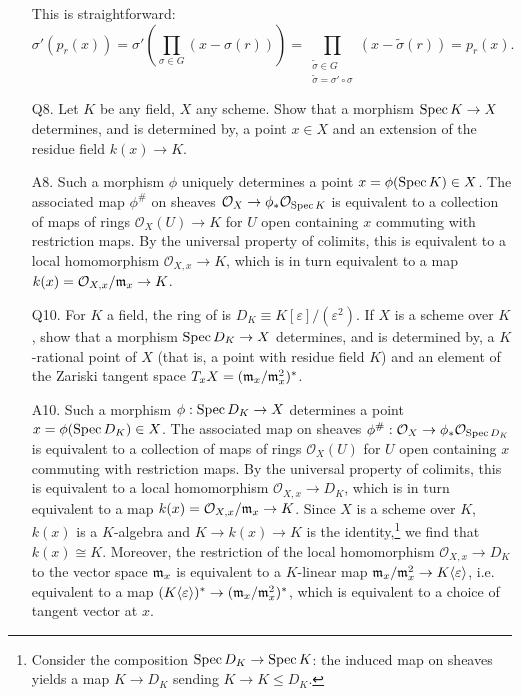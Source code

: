 \documentclass{../mathnotes}
\begin{document}
\begin{enumerate}
        This is straightforward:
        \[\sigma'\left( p_r(x) \right)=\sigma'\left( \prod_{\sigma\in G}(x-\sigma(r)) \right)=\prod_{\substack{\tilde\sigma\in G\\\tilde\sigma=\sigma'\circ\sigma}}(x-\tilde\sigma(r))=p_r(x).\]
    \item[Q8.] Let $K$ be any field, $X$ any scheme. Show that a morphism $\operatorname{Spec} K\to X$ determines,
        and is determined by, a point $x\in X$ and an extension of the residue field $k(x)\to K$.
    \item[A8.] Such a morphism $\phi$ uniquely determines a point $x=\phi(\operatorname{Spec} K)\in X$. The associated
        map $\phi^\#$ on sheaves $\mathcal{O}_X\to\phi_*\mathcal{O}_{\operatorname{Spec} K}$ is equivalent to a collection
        of maps of rings $\mathcal{O}_X(U)\to K$ for $U$ open containing $x$ commuting with restriction maps.
        By the universal property of colimits, this is equivalent to a local homomorphism $\mathcal{O}_{X,x}\to K$,
        which is in turn equivalent to a map $k(x)=\mathcal{O}_{X,x}/\mathfrak m_x\to K$.
    \item[Q10.] For $K$ a field, the ring of  is $D_K\equiv K[\varepsilon]/(\varepsilon^2)$.
        If $X$ is a scheme over $K$, show that a morphism $\operatorname{Spec} D_K\to X$ determines, and is determined by,
        a $K$-rational point of $X$ (that is, a point with residue field $K$) and an element of the Zariski
        tangent space $T_xX=(\mathfrak m_x/\mathfrak m_x^2)^*$.
    \item[A10.] Such a morphism $\phi:\operatorname{Spec} D_K\to X$ determines a point $x=\phi(\operatorname{Spec} D_K)\in X$.
        The associated map on sheaves $\phi^\#:\mathcal{O}_X\to\phi_*\mathcal{O}_{\operatorname{Spec} D_K}$ is equivalent
        to a collection of maps of rings $\mathcal{O}_X(U)$ for $U$ open containing $x$ commuting with
        restriction maps. By the universal property of colimits, this is equivalent to a local homomorphism
        $\mathcal{O}_{X,x}\to D_K$, which is in turn equivalent to a map $k(x)=\mathcal{O}_{X,x}/\mathfrak m_x\to K$.
        Since $X$ is a scheme over $K$, $k(x)$ is a $K$-algebra and $K\to k(x)\to K$ is the identity,\footnote{
            Consider the composition $\operatorname{Spec} D_K\to\operatorname{Spec} K$: the induced map on sheaves yields a map $K\to D_K$
            sending $K\to K\leq D_K$.}
        we find that $k(x)\cong K$.
        Moreover, the restriction of the local homomorphism $\mathcal{O}_{X,x}\to D_K$ to the vector space $\mathfrak m_x$
        is equivalent to a $K$-linear map $\mathfrak m_x/\mathfrak m_x^2\to K\langle\varepsilon\rangle$, i.e. equivalent
        to a map $(K\langle\varepsilon\rangle)^*\to(\mathfrak m_x/\mathfrak m_x^2)^*$, which is equivalent to a choice
        of tangent vector at $x$.
\end{enumerate}
\end{document}
